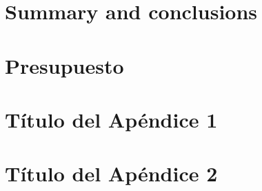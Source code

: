 \documentclass[spanish,a4paper,14pt,oneside]{extreport}
\begin{document}
  
   
  \newpage{\pagestyle{empty}}
  \thispagestyle{empty}
   
  \chapter{Summary and conclusions}
  \label{chapter:ingles}
   
  
   
  \newpage{\pagestyle{empty}}
  \thispagestyle{empty}
   
  \chapter{Presupuesto}
  \label{chapter:Presupuesto}
   
  

  \newpage{\pagestyle{empty}}
  \thispagestyle{empty}
  \begin{appendix}
   
  \chapter{Título del Apéndice 1}
  \label{appendix:1}
  
   
  \chapter{Título del Apéndice 2}
  \label{appendix:2}
  
   
  \end{appendix}
   
  
   
  
   
   
  
\end{document}
